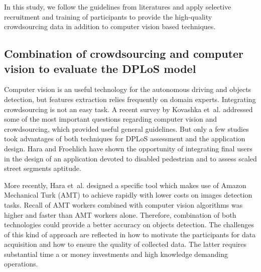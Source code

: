 \documentclass[10pt,conference,a4paper]{IEEEtran}
\begin{document}



In this study, we follow the guidelines from literatures and apply selective recruitment and training of participants to provide the high-quality crowdsourcing data in addition to computer vision based techniques.

\subsection{Combination of crowdsourcing and computer vision to evaluate the DPLoS model}
Computer vision is an useful technology for the autonomous driving and objects detection, but features extraction relies frequently on domain experts. Integrating crowdsourcing is not an easy task. A recent survey by Kovashka et~al. \cite{kovashka2016crowdsourcing} addressed some of the most important questions regarding computer vision and crowdsourcing, which provided useful general guidelines. But only a few studies took advantages of both techniques for DPLoS assessment and the application design.
Hara and Froehlich \cite{hara_feasibility_2012}
have shown the opportunity of integrating final users in the design of an application devoted to disabled pedestrian and to assess scaled street segments aptitude.

More recently, Hara et~al. \cite{hara_tohme:_2014,hara_characterizing_2015} designed a specific tool which makes use of Amazon Mechanical Turk (AMT) to achieve rapidly with lower costs on images detection tasks. Recall of AMT workers combined with computer vision algorithms was higher and faster than AMT workers alone. Therefore, combination of both technologies could provide a better accuracy on objects detection. The challenges of this kind of approach are reflected in how to motivate the participants for data acquisition and how to ensure the quality of collected data. The latter requires substantial time a or money investments and high knowledge demanding operations.
\end{document}

